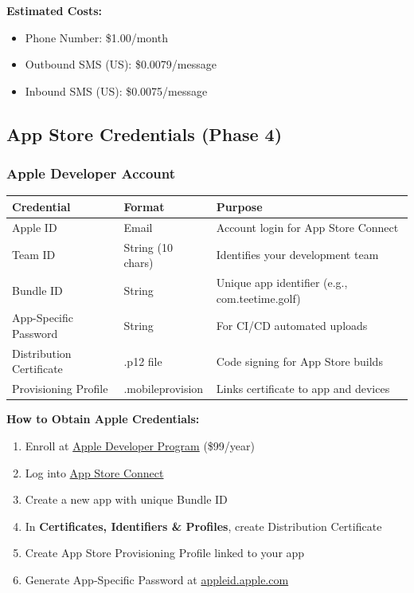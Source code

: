 \documentclass[11pt,a4paper]{article}
\begin{document}
\vspace{0.3cm}
\textbf{Estimated Costs:}
\begin{itemize}
\item Phone Number: \$1.00/month
\item Outbound SMS (US): \$0.0079/message
\item Inbound SMS (US): \$0.0075/message
\end{itemize}


\subsection{App Store Credentials (Phase 4)}

\subsubsection{Apple Developer Account}

\begin{tabularx}{\textwidth}{|p{4cm}|p{3cm}|Y|}
\hline
{}
\textbf{Credential} & \textbf{Format} & \textbf{Purpose} \\
\hline
Apple ID & Email & Account login for App Store Connect \\
\hline
Team ID & String (10 chars) & Identifies your development team \\
\hline
Bundle ID & String & Unique app identifier (e.g., com.teetime.golf) \\
\hline
App-Specific Password & String & For CI/CD automated uploads \\
\hline
Distribution Certificate & .p12 file & Code signing for App Store builds \\
\hline
Provisioning Profile & .mobileprovision & Links certificate to app and devices \\
\hline
\end{tabularx}

\vspace{0.3cm}
\textbf{How to Obtain Apple Credentials:}
\begin{enumerate}[label=\arabic*.]
\item Enroll at \href{https://developer.apple.com/programs/}{Apple Developer Program} (\$99/year)
\item Log into \href{https://appstoreconnect.apple.com}{App Store Connect}
\item Create a new app with unique Bundle ID
\item In \textbf{Certificates, Identifiers \& Profiles}, create Distribution Certificate
\item Create App Store Provisioning Profile linked to your app
\item Generate App-Specific Password at \href{https://appleid.apple.com}{appleid.apple.com}
\end{enumerate}
\end{document}
